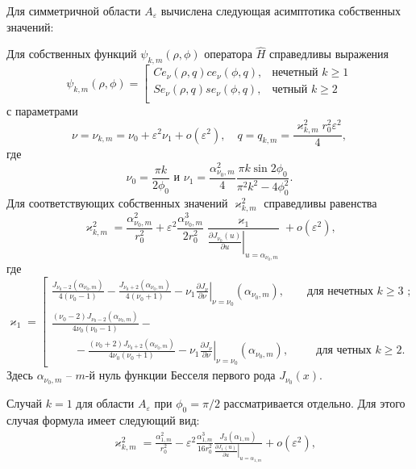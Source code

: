 Для симметричной области $A_\varepsilon$ вычислена следующая асимптотика собственных значений:
\begin{theorem} 
Для собственных функций $\psi_{k, m}(\rho, \phi)$ оператора   $\hat{H}$ справедливы выражения
\begin{equation}
\psi_{k, m}(\rho, \phi) = 
\left[
\begin{array}{ll}
    Ce_\nu(\rho, q) ce_\nu(\phi, q) ,   &    \text{нечетный $k \geq 1$}\\
    Se_\nu(\rho, q) se_\nu(\phi, q) ,   &    \text{четный $k \geq 2$}\\
\end{array}
\right.\label{eq:fun}
\end{equation}
с параметрами
\[
\nu = \nu_{k,m} = \nu_0+ \varepsilon^2 \nu_1 + o(\varepsilon^2),  \quad q=q_{k,m} = \dfrac{\varkappa_{k,m}^2 r_0^2 \varepsilon^2}{4},
\]
где
$$\nu_0 = \frac{\pi k}{2\phi_0}\text{\ \  и\  \  }\nu_1=\frac{\alpha_{\nu_0, m}^2}{4} \frac{\pi k \sin 2\phi_0}{\pi^2 k^2 - 4\phi_0^2}  .$$
Для соответствующих собственных  значений  $\varkappa^2_{k, m}$ справедливы равенства
\begin{equation}
\varkappa^2_{k, m} = \dfrac{\alpha_{\nu_0, m}^2}{r_0^2} +
\varepsilon^2 \dfrac{\alpha_{\nu_0, m}^3}{2 r_0^2}\dfrac{\varkappa_1 }{ \left.\frac{\partial J_{\nu_0}(u)}{\partial u}\right|_{u=\alpha_{\nu_0, m}} } + o(\varepsilon^2),\label{eq:val}
\end{equation}
где
\begin{equation*}
    \varkappa_1 = 
    \left[
\begin{array}{ll}
\frac{J_{\nu_0-2}(\alpha_{\nu_0, m})}{4(\nu_0-1)} - \frac{J_{\nu_0+2}(\alpha_{\nu_0, m})}{4(\nu_0+1)} 
  - \nu_1 \left.\frac{\partial J_\nu}{\partial \nu}\right|_{\nu=\nu_0}(\alpha_{\nu_0, m}),\qquad \text{для нечетных $k\geq 3$ ;} \\[10pt]
\frac{(\nu_0 - 2)J_{\nu_0-2}(\alpha_{\nu_0, m})   }{4\nu_0 (\nu_0-1)} -\\
\qquad - \frac{(\nu_0 + 2)J_{\nu_0+2}(\alpha_{\nu_0, m})}{4\nu_0 (\nu_0+1)}  
- \nu_1 \left.\frac{\partial J_\nu}{\partial \nu}\right|_{\nu = \nu_0}(\alpha_{\nu_0, m}), \qquad \ \ \!    \text{для четных $k \geq 2$}.        
\end{array}
\right.
\end{equation*}
Здесь $\alpha_{\nu_0,m}$ --  $m$-й нуль функции Бесселя первого рода $J_{\nu_0}(x)$.
\end{theorem} 
Случай $k=1$ для области $A_\varepsilon$ при $\phi_0=\pi/2$ рассматривается отдельно. Для этого случая формула имеет следующий вид:
\begin{align}
   & \varkappa_{k, m}^2 = \frac{\alpha_{1, m}^2}{r_0^2} - \varepsilon^2 \frac{\alpha_{1, m}^3}{16r_0^2} 
    \frac{J_3(\alpha_{1, m})}{\left.\frac{\partial J_1 (u)}{\partial u}\right|_{u=\alpha_{1, m}}} 
    + o(\varepsilon^2), \label{eq:valS1}
    \end{align}

